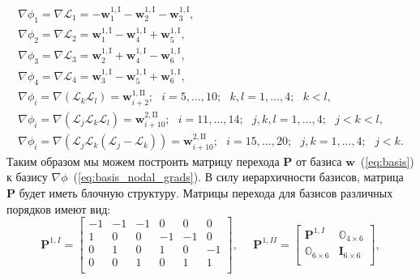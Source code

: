 \documentclass[a4paper,14pt]{article}
\begin{document}
\begin{equation}
	\begin{matrix}
		\displaystyle
		\nabla \phi_{1} = \nabla \mathcal{L}_1 = - \mathbf{w}_{1}^{1,\mathrm{I}} - \mathbf{w}_{2}^{1,\mathrm{I}} - \mathbf{w}_{3}^{1,\mathrm{I}} ,\\
		\displaystyle
		\nabla \phi_{2} = \nabla \mathcal{L}_2 = \mathbf{w}_{1}^{1,\mathrm{I}} - \mathbf{w}_{4}^{1,\mathrm{I}} + \mathbf{w}_{5}^{1,\mathrm{I}} ,\\
		\displaystyle
		\nabla \phi_{3} = \nabla \mathcal{L}_3 = \mathbf{w}_{2}^{1,\mathrm{I}} + \mathbf{w}_{4}^{1,\mathrm{I}} - \mathbf{w}_{6}^{1,\mathrm{I}} ,\\
		\displaystyle
		\nabla \phi_{4} = \nabla \mathcal{L}_4 = \mathbf{w}_{3}^{1,\mathrm{I}} - \mathbf{w}_{5}^{1,\mathrm{I}} + \mathbf{w}_{6}^{1,\mathrm{I}} ,\\
		\displaystyle
		\nabla \phi_{i} = \nabla ( \mathcal{L}_k \mathcal{L}_l ) = \mathbf{w}_{i+2}^{1,\mathrm{II}} ;
		\scriptstyle
		\text{~~} i = 5, ..., 10 ; \text{~~} k, l = 1, ..., 4 ; \text{~~} k < l ,\\
		\displaystyle
		\nabla \phi_{i} = \nabla ( \mathcal{L}_j \mathcal{L}_k \mathcal{L}_l ) = \mathbf{w}_{i+10}^{2,\mathrm{II}} ;
		\scriptstyle
		\text{~~} i = 11, ..., 14 ; \text{~~} j, k, l = 1, ..., 4 ; \text{~~} j < k < l ,\\
		\displaystyle
		\nabla \phi_{i} = \nabla ( \mathcal{L}_j \mathcal{L}_k ( \mathcal{L}_j - \mathcal{L}_k ) ) = \mathbf{w}_{i+10}^{2,\mathrm{II}} ;
		\scriptstyle
		\text{~~} i = 15, ..., 20 ; \text{~~} j, k = 1, ..., 4 ; \text{~~} j < k .
	\end{matrix}
	\label{eq:basis_nodal_grads}
\end{equation}
Таким образом мы можем построить матрицу перехода $\mathbf{P}$ от базиса $\mathbf{w}$~(\ref{eq:basis}) к базису $\nabla \phi$~(\ref{eq:basis_nodal_grads}). В силу иерархичности базисов, матрица $\mathbf{P}$ будет иметь блочную структуру. Матрицы перехода для базисов различных порядков имеют вид:
\begin{equation*}
	\mathbf{P}^{1,I} = \left[
	\begin{matrix}
		−1 & −1 & −1 &  0 &  0 &  0 \\
		 1 &  0 &  0 & −1 & −1 &  0 \\
		 0 &  1 &  0 &  1 &  0 & −1 \\
		 0 &  0 &  1 &  0 &  1 &  1 \\
	\end{matrix}
	\right],
\text{~~~~}
	\mathbf{P}^{1,II} = \left[
	\begin{matrix}
		\mathbf{P}^{1,I} & \mathbb{O}_{4 \times 6} \\
		\mathbb{O}_{6 \times 6} & \mathbf{I}_{6 \times 6} \\
	\end{matrix}
	\right],
\end{equation*}
\end{document}
